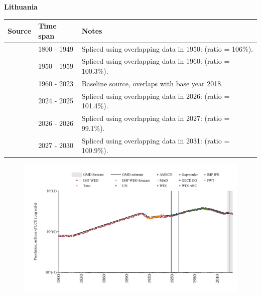 \documentclass[12pt,a4paper,landscape]{article}
\begin{document}
\begin{adjustbox}{max totalsize={\paperwidth}{\paperheight},center}
\begin{minipage}[t][\textheight][t]{\textwidth}
\vspace*{0.5cm}
{}
\begin{center}
{\Large\bfseries Lithuania}
\end{center}
\vspace{0.5cm}
\begin{table}[H]
\centering
\small
\begin{tabular}{|l|l|l|}
\hline
\textbf{Source} & \textbf{Time span} & \textbf{Notes} \\
\hline
\rowcolor{white}\cite{Gapminder}& 1800 - 1949 &Spliced using overlapping data in 1950: (ratio = 106\%).\\
\rowcolor{lightgray}\cite{IMF_IFS}& 1950 - 1959 &Spliced using overlapping data in 1960: (ratio = 100.3\%).\\
\rowcolor{white}\cite{WDI}& 1960 - 2023 &Baseline source, overlaps with base year 2018.\\
\rowcolor{lightgray}\cite{OECD_EO}& 2024 - 2025 &Spliced using overlapping data in 2026: (ratio = 101.4\%).\\
\rowcolor{white}\cite{AMECO}& 2026 - 2026 &Spliced using overlapping data in 2027: (ratio = 99.1\%).\\
\rowcolor{lightgray}\cite{Gapminder}& 2027 - 2030 &Spliced using overlapping data in 2031: (ratio = 100.9\%).\\
\hline
\end{tabular}
\end{table}
\begin{figure}[H]
\centering
\includegraphics[width=\textwidth,height=0.6\textheight,keepaspectratio]{graphs/LTU_pop.pdf}
\end{figure}
\end{minipage}
\end{adjustbox}
\end{document}
